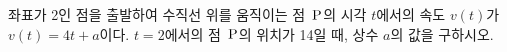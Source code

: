 좌표가 2인 점을 출발하여 수직선 위를 움직이는 점~$\mathrm{P}$의 시각 $t$에서의 속도 $v(t)$가 $v(t)=4t+a$이다. $t=2$에서의 점~$\mathrm{P}$의 위치가 14일 때, 상수 $a$의 값을 구하시오.
